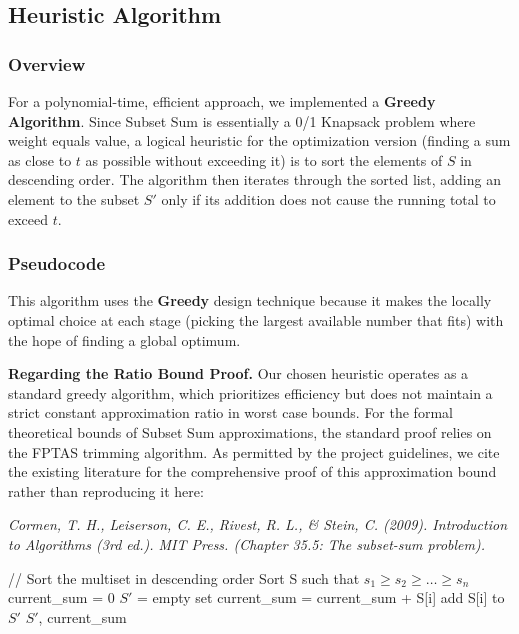 \documentclass[12pt,a4paper]{article}
\begin{document}
\subsection{Heuristic Algorithm}

\subsubsection{Overview}
For a polynomial-time, efficient approach, we implemented a \textbf{Greedy Algorithm}. Since Subset Sum is essentially a 0/1 Knapsack problem where weight equals value, a logical heuristic for the optimization version (finding a sum as close to $t$ as possible without exceeding it) is to sort the elements of $S$ in descending order. The algorithm then iterates through the sorted list, adding an element to the subset $S'$ only if its addition does not cause the running total to exceed $t$.

\subsubsection{Pseudocode}
This algorithm uses the \textbf{Greedy} design technique because it makes the locally optimal choice at each stage (picking the largest available number that fits) with the hope of finding a global optimum.

\textbf{Regarding the Ratio Bound Proof.} Our chosen heuristic operates as a standard greedy algorithm, which prioritizes efficiency but does not maintain a strict constant approximation ratio in worst case bounds. For the formal theoretical bounds of Subset Sum approximations, the standard proof relies on the FPTAS trimming algorithm. As permitted by the project guidelines, we cite the existing literature for the comprehensive proof of this approximation bound rather than reproducing it here:

\textit{Cormen, T. H., Leiserson, C. E., Rivest, R. L., \& Stein, C. (2009). Introduction to Algorithms (3rd ed.). MIT Press. (Chapter 35.5: The subset-sum problem).}

\begin{algorithm}[H]
\caption{GreedySubsetSum(S, n, t)}
\begin{algorithmic}
\STATE // Sort the multiset in descending order
\STATE Sort S such that $s_1 \geq s_2 \geq \ldots \geq s_n$
\STATE current\_sum = 0
\STATE $S'$ = empty set
        \STATE current\_sum = current\_sum + S[i]
        \STATE add S[i] to $S'$
    \ENDIF
\ENDFOR
\RETURN $S'$, current\_sum
\end{algorithmic}
\end{algorithm}
\end{document}
